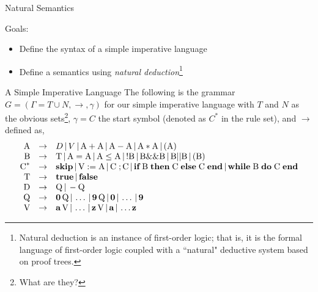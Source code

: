 \documentclass{beamer}
\begin{document}
\begin{frame}{Natural Semantics}

Goals:
\begin{itemize}
\item Define the syntax of a simple imperative language
\item Define a semantics using {\em natural deduction}\footnote{Natural deduction is an
instance of first-order logic; that is, it is the formal language of first-order logic
coupled with a ``natural" deductive system based on proof trees.}
\end{itemize}
\end{frame}

\begin{frame}{A Simple Imperative Language}
\scriptsize
The following is the grammar
 $G=(\Gamma=T\cup N,\rightarrow,\gamma)$ for our simple imperative language with $T$ and $N$ as the obvious sets\footnote{What are they?}, $\gamma=C$ the start symbol (denoted as $C^*$ in the rule set), and $\rightarrow$ defined as,
{
\[
\begin{array}{rcl}
\mbox{A} &\rightarrow& D \,|\, V \,|\, \mbox{A} +\mbox{A} \,|\, \mbox{A} - \mbox{A} \,|\,
	\mbox{A} * \mbox{A}\,|\, ( \mbox{A} )\\

\mbox{B} &\rightarrow& \mbox{T}  \,|\, \mbox{A} = \mbox{A} \,|\,
	\mbox{A} \le \mbox{A} \,|\, ! \mbox{B} \,|\, \mbox{B} \&\& \mbox{B} \,|\,
	\mbox{B} || \mbox{B} \,|\, (\mbox{B})\\

\mbox{C}^* &\rightarrow& \mbox{\bf skip} \,|\, \mbox{V} := \mbox{A} \,|\,\mbox{C}\; ; \mbox{C} \,|\,
	\mbox{\bf if} \; \mbox{B}\; \mbox{\bf then}\;\mbox{C}\; \mbox{\bf else}\; \mbox{C} \; \mbox{\bf end}\,|\,
	\mbox{\bf while}\; \mbox{B}\; \mbox{\bf  do}\; \mbox{C}\; \mbox{\bf end}\\

\mbox{T} &\rightarrow& \mbox{\bf true} \,|\, \mbox{\bf false}\\

\mbox{D} &\rightarrow& \mbox{Q} \,|\, - \mbox{Q}\\

\mbox{Q} &\rightarrow& \mbox{\bf 0}\, \mbox{Q} \,|\, \ldots \,|\,  \mbox{\bf 9} \,\mbox{Q} \,|\, \mbox{\bf 0} \,|\, \ldots\,|\,\mbox{\bf 9}\\

\mbox{V} &\rightarrow& \mbox{\bf a}\,\mbox{V} \,|\, \ldots\,|\, \mbox{\bf z}\,\mbox{V} \,|\, \mbox{\bf a} \,|\, \ldots \mbox{\bf z}
\end{array}
\]
}
\end{frame}
\end{document}
